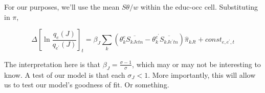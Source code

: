 \documentclass[12pt]{article}
\begin{document}
For our purposes, we'll use the mean $S\theta/w$ within the educ-occ cell. Substituting in $\pi$,

\begin{equation}
\Delta \left[\ln \frac{q_e(J)}{q_{e^\prime}(J)}\right]_t= \beta_J\sum_k\left(\theta_k^e \overline{S_{kJetn}}-\theta_k^{e^\prime} \overline{S_{kJe^\prime tn}}\right)\hat{\pi}_{kJt}+const_{e,e^\prime,t}
\end{equation}

The interpretation here is that $\beta_J=\frac{\sigma-1}{\sigma}$, which may or may not be interesting to know. A test of our model is that each $\sigma_J<1$. More importantly, this will allow us to test our model's goodness of fit. Or something.
\end{document}
